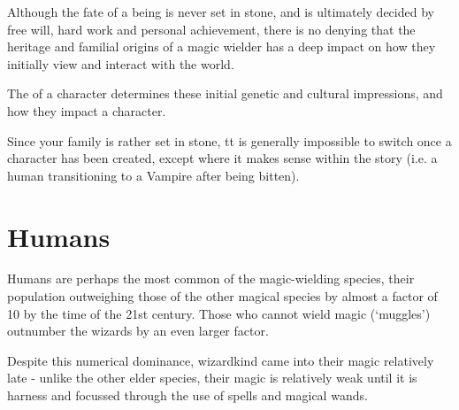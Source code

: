 
 \label{C:Species} 
 
 
 Although the fate of a being is never set in stone, and is ultimately decided by free will, hard work and personal achievement, there is no denying that the heritage and familial origins of a magic wielder has a deep impact on how they initially view and interact with the world. 
 
 The  of a character determines these initial genetic and cultural impressions, and how they impact a character.
 
 
 Since your family is rather set in stone, tt is generally impossible to switch once a character has been created, except where it makes sense within the story (i.e. a human transitioning to a Vampire after being bitten). 



\newcommand\family[4]
{
	\index{#1}
	\subsubsection{#1}
	
	#3
	
	Coming from a #2 heritage gives you the following additional bonuses and feats:

	\begin{itemize}[leftmargin = 7pt]
		#4
	\end{itemize}
}

\newcommand\famAb[3]
{
	\item \key{#1}: {\it #2}
	
	#3
}


\section{Humans}

	Humans are perhaps the most common of the magic-wielding species, their population outweighing those of the other magical species by almost a factor of 10 by the time of the 21st century. Those who cannot wield magic (`muggles') outnumber the wizards by an even larger factor. 
	
	Despite this numerical dominance, wizardkind came into their magic relatively late - unlike the other elder species, their magic is relatively weak until it is harness and focussed through the use of spells and magical wands. 

